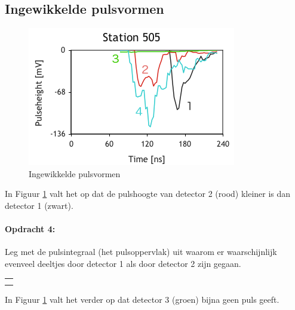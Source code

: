 \subsection{Ingewikkelde pulsvormen}

\begin{figure}[h]
\noindent \begin{centering}
\includegraphics[scale=0.65]{Figures/Traces505}
\par\end{centering}

\caption{\label{fig:Ingewikkelde-pulsvormen}Ingewikkelde pulsvormen}
\end{figure}


\bigskip{}


In Figuur \ref{fig:Ingewikkelde-pulsvormen} valt het op dat de pulshoogte van detector 2 (rood) kleiner is dan
detector 1 (zwart).

\begin{minipage}[t]{1\columnwidth}%

\paragraph{Opdracht 4:}

Leg met de pulsintegraal (het pulsoppervlak) uit waarom er
waarschijnlijk evenveel deeltjes door detector 1 als door detector
2 zijn gegaan.

\begin{tabular}{>{\raggedright}p{16.6cm}}
\tabularnewline
\hline 
\tabularnewline
\hline 
\tabularnewline
\hline 
\tabularnewline
\hline 
\end{tabular}%
\end{minipage}

\bigskip{}


In Figuur \ref{fig:Ingewikkelde-pulsvormen} valt het verder op dat detector 3 (groen) bijna geen puls geeft.

